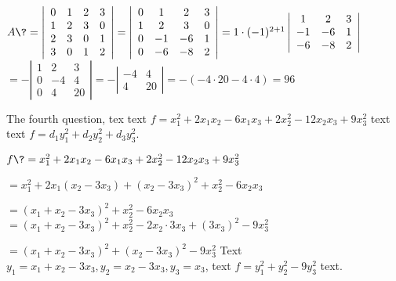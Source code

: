 \documentclass[12pt,math=all]{randexam}
\begin{document}
\smallskip

\begin{solution}
$A \? = \left|\begin{array}{cccc}
    0 & 1 & 2 & 3\\
    1 & 2 & 3 & 0\\
    2 & 3 & 0 & 1\\
    3 & 0 & 1 & 2
  \end{array}\right| = \left|\begin{array}{cccc}
    0 & 1 & 2 & 3\\
    1 & 2 & 3 & 0\\
    0 & - 1 & - 6 & 1\\
    0 & - 6 & - 8 & 2
  \end{array}\right| = 1 \cdot (- 1)^{2 + 1} \left|\begin{array}{ccc}
    1 & 2 & 3\\
    - 1 & - 6 & 1\\
    - 6 & - 8 & 2
  \end{array}\right|$ 
\+ $= -\left|\begin{array}{ccc}
    1 & 2 & 3\\
    0 & - 4 & 4\\
    0 & 4 & 20
  \end{array}\right| = - \left|\begin{array}{cc}
    - 4 & 4\\
    4 & 20
  \end{array}\right| = -(-4\cdot20-4\cdot4) = 96$ 
\end{solution}

\vfill

\begin{question}
The fourth question, tex text $f = x_1^2 + 2 x_1 x_2 - 6 x_1 x_3 + 2 x_2^2 - 12
x_2 x_3 + 9 x^2_3$ text text $f = d_1 y^2_1 + d_2 y^2_2 + d_3 y^2_3$.
\end{question}

\smallskip

\begin{solution}
$f \? = x_1^2 + 2 x_1 x_2 - 6 x_1 x_3 + 2 x_2^2 - 12 x_2 x_3 + 9 x^2_3$ \par
  \+ $= x_1^2 + 2 x_1 (x_2 - 3 x_3) + (x_2 - 3 x_3)^2 + x_2^2 - 6 x_2 x_3 $ \par
  \+ $= (x_1 + x_2 - 3 x_3)^2 + x_2^2 - 6 x_2 x_3$ 
  \+ $= (x_1 + x_2 - 3 x_3)^2 + x_2^2 - 2 x_2 \cdot 3 x_3 + (3 x_3)^2 - 9x_3^2$ \par
  \+ $= (x_1 + x_2 - 3 x_3)^2 + (x_2 - 3 x_3)^2 - 9 x_3^2$ 
Text $y_1 = x_1 + x_2 - 3 x_3, y_2 = x_2 - 3 x_3, y_3 = x_3$, \newline
text $f = y_1^2 + y_2^2 - 9y_3^2$ text.
\end{solution}
\end{document}

